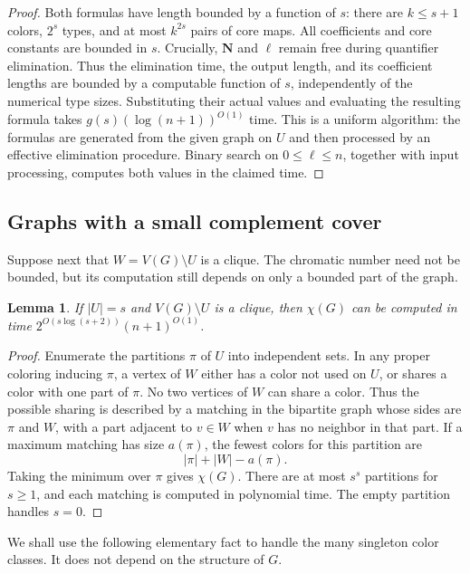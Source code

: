 \documentclass[11pt,reqno]{amsart}
\numberwithin{equation}{section}
\newtheorem{lemma}[theorem]{Lemma}
\theoremstyle{definition}
\theoremstyle{remark}
\begin{document}
\begin{proof}
Both formulas have length bounded by a function of $s$: there are
$k\leq s+1$ colors, $2^s$ types, and at most $k^{2s}$ pairs of
core maps. All coefficients and core constants are bounded in $s$.
Crucially, $\mathbf N$ and $\ell$ remain free during quantifier
elimination. Thus the elimination time, the output length, and its
coefficient lengths are bounded by a computable function of $s$,
independently of the numerical type sizes.
Substituting their actual values and evaluating the resulting formula
takes $g(s)(\log(n+1))^{O(1)}$ time. This is a uniform algorithm:
the formulas are generated from the given graph on $U$ and then
processed by an effective elimination procedure. Binary search on
$0\leq\ell\leq n$, together with input processing, computes both
values in the claimed time.
\end{proof}

\subsection{Graphs with a small complement cover}

Suppose next that $W=V(G)\setminus U$ is a clique. The chromatic
number need not be bounded, but its computation still depends on
only a bounded part of the graph.

\begin{lemma}\label{rec:chromatic}
If $|U|=s$ and $V(G)\setminus U$ is a clique, then $\chi(G)$ can be
computed in time $2^{O(s\log(s+2))}(n+1)^{O(1)}$.
\end{lemma}
\begin{proof}
Enumerate the partitions $\pi$ of $U$ into independent sets. In any
proper coloring inducing $\pi$, a vertex of $W$ either has a color
not used on $U$, or shares a color with one part of $\pi$.
No two vertices of $W$ can share a color. Thus the possible sharing
is described by a matching in the bipartite graph whose sides are
$\pi$ and $W$, with a part adjacent to $v\in W$ when $v$ has no
neighbor in that part. If a maximum matching has size $a(\pi)$,
the fewest colors for this partition are
\[
|\pi|+|W|-a(\pi).
\]
Taking the minimum over $\pi$ gives $\chi(G)$. There are at most
$s^s$ partitions for $s\geq1$, and each matching is computed in
polynomial time. The empty partition handles $s=0$.
\end{proof}

We shall use the following elementary fact to handle the many
singleton color classes. It does not depend on the structure of $G$.
\end{document}
